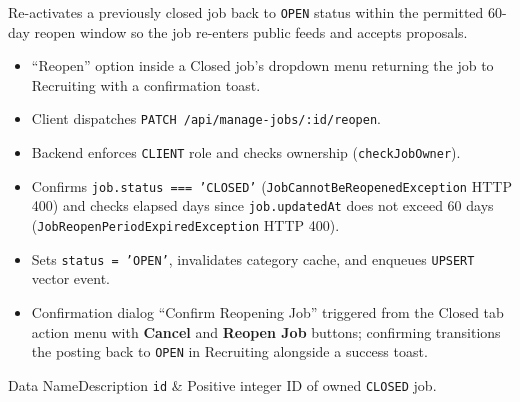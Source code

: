 \noindent Re-activates a previously closed job back to \texttt{OPEN} status within the permitted 60-day reopen window so the job re-enters public feeds and accepts proposals.

\begin{itemize}[leftmargin=1.6em,topsep=3pt,itemsep=2pt,parsep=0pt,label=$\bullet$]
    \item ``Reopen'' option inside a Closed job's dropdown menu returning the job to Recruiting with a confirmation toast.
\end{itemize}

\begin{itemize}[leftmargin=1.6em,topsep=3pt,itemsep=2pt,parsep=0pt,label=$\bullet$]
    \item Client dispatches \texttt{PATCH /api/manage-jobs/:id/reopen}.
    \item Backend enforces \texttt{CLIENT} role and checks ownership (\texttt{checkJobOwner}).
    \item Confirms \texttt{job.status === 'CLOSED'} (\texttt{JobCannotBeReopenedException} HTTP 400) and checks elapsed days since \texttt{job.updatedAt} does not exceed 60 days (\texttt{JobReopenPeriodExpiredException} HTTP 400).
    \item Sets \texttt{status = 'OPEN'}, invalidates category cache, and enqueues \texttt{UPSERT} vector event.
\end{itemize}

\begin{itemize}[leftmargin=1.6em,topsep=3pt,itemsep=2pt,parsep=0pt,label=$\bullet$]
    \item Confirmation dialog ``Confirm Reopening Job'' triggered from the Closed tab action menu with \textbf{Cancel} and \textbf{Reopen Job} buttons; confirming transitions the posting back to \texttt{OPEN} in Recruiting alongside a success toast.
\end{itemize}


\begin{specdatatable}{Data Name}{Description}
\texttt{id} & Positive integer ID of owned \texttt{CLOSED} job.\\ \hline
\end{specdatatable}

